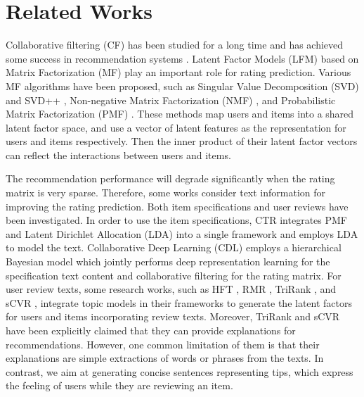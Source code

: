 \documentclass[sigconf]{acmart}
\begin{document}
\section{Related Works}
\label{section2}

Collaborative filtering (CF) has been studied for a long time and has achieved some success in recommendation systems \cite{ricci2011introduction,su2009survey}.
Latent Factor Models (LFM) based on Matrix Factorization (MF) \cite{koren2009matrix} play an important role for rating prediction. Various MF algorithms have been proposed, such as Singular Value Decomposition (SVD) and SVD++ \cite{koren2008factorization}, Non-negative Matrix Factorization (NMF) \cite{lee2001algorithms}, and Probabilistic Matrix Factorization (PMF) \cite{mnih2007probabilistic}. These methods map users and items into a shared latent factor space, and use a vector of latent features as the representation for users and items respectively. Then the inner product of their latent factor vectors can reflect the interactions between users and items.

The recommendation performance will degrade significantly when the rating matrix is very sparse. Therefore, some works consider text information for improving the rating prediction. Both item specifications and user reviews have been investigated.
In order to use the item specifications,
CTR \cite{wang2011collaborative} integrates PMF \cite{mnih2007probabilistic} and Latent Dirichlet Allocation (LDA) \cite{blei2003latent} into a single framework and employs LDA to model the text.
Collaborative Deep Learning (CDL) \cite{wang2015collaborative} employs a hierarchical Bayesian model which jointly performs deep representation learning for the specification text content and collaborative filtering for the rating matrix.
For user review texts, some research works, such as HFT \cite{mcauley2013hidden}, RMR \cite{ling2014ratings}, TriRank \cite{he2015trirank}, and sCVR \cite{rensocial2017}, integrate topic models in their frameworks to generate the latent factors for users and items incorporating review texts.
Moreover, TriRank and sCVR have been explicitly claimed that they can provide explanations for recommendations. However, one common limitation of them is that their explanations are simple extractions of words or phrases from the texts.
In contrast, we aim at generating concise sentences representing tips, which express the feeling of users while they are reviewing an item. 
\end{document}
